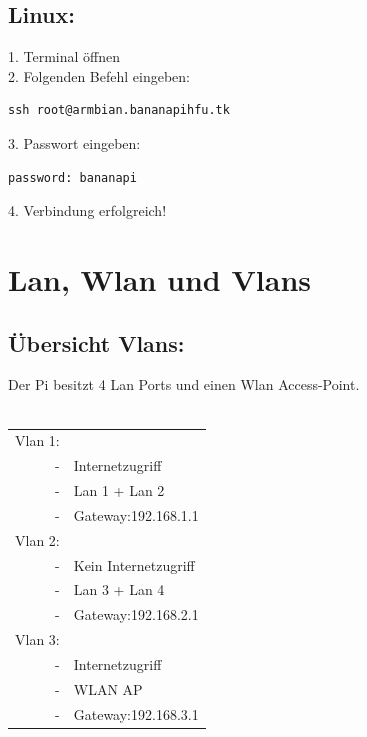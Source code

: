 \subsection*{Linux:}
1. Terminal öffnen\\
2. Folgenden Befehl eingeben:
\begin{lstlisting}
ssh root@armbian.bananapihfu.tk
\end{lstlisting}
3. Passwort eingeben:
\begin{lstlisting}
password: bananapi
\end{lstlisting}
4. Verbindung erfolgreich!
\newpage
\section{Lan, Wlan und Vlans}
\subsection*{Übersicht Vlans:}
Der Pi besitzt 4 Lan Ports und einen Wlan Access-Point.\\
~\\
\begin{tabular}{r l}
Vlan 1:   & \\
	- & Internetzugriff\\
	- & Lan 1 + Lan 2\\
	- & Gateway:192.168.1.1\\
Vlan 2:   & \\
	- & Kein Internetzugriff\\
	- & Lan 3 + Lan 4\\
	- & Gateway:192.168.2.1\\
Vlan 3:   & \\
	- & Internetzugriff\\
	- & WLAN AP\\
	- & Gateway:192.168.3.1\\
\end{tabular}


